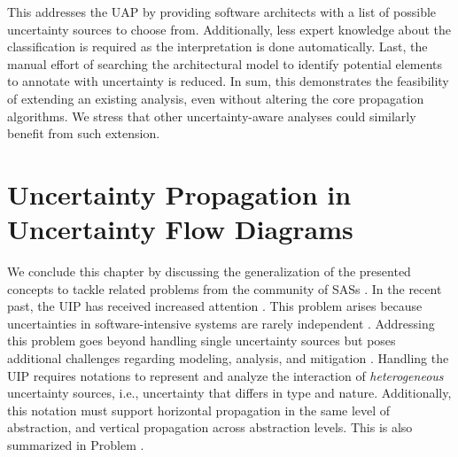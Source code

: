 This addresses the \ac{UAP} by providing software architects with a list of possible uncertainty sources to choose from.
Additionally, less expert knowledge about the classification is required as the interpretation is done automatically.
Last, the manual effort of searching the architectural model to identify potential elements to annotate with uncertainty is reduced.
In sum, this demonstrates the feasibility of extending an existing analysis, even without altering the core propagation algorithms.
We stress that other uncertainty-aware analyses \cite{hahner_model-based_2023,walter_architectural_2022,walter_architecture-based_2023} could similarly benefit from such extension.






\section{Uncertainty Propagation in Uncertainty Flow Diagrams}%
\label{sec:impactanalysis:ufd}

We conclude this chapter by discussing the generalization of the presented concepts to tackle related problems from the community of \acp{SAS} \cite{weyns_towards_2023}.
In the recent past, the \acf{UIP} has received increased attention \cite{camara_addressing_2022,camara_uncertainty_2022,weyns_towards_2023}.
This problem arises because uncertainties in software-intensive systems are rarely independent \cite{camara_uncertainty_2022}.
Addressing this problem goes beyond handling single uncertainty sources but poses additional challenges regarding modeling, analysis, and mitigation \cite{camara_addressing_2022}.
Handling the \ac{UIP} requires notations to represent and analyze the interaction of \emph{heterogeneous} uncertainty sources, i.e., uncertainty that differs in type and nature.
Additionally, this notation must support horizontal propagation in the same level of abstraction, and vertical propagation across abstraction levels.
This is also summarized in Problem .

